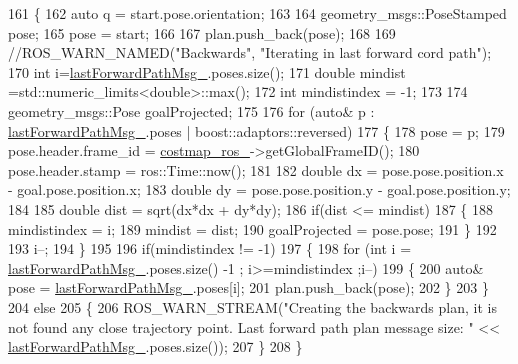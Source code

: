 \begin{DoxyCode}
161 \{
162     \textcolor{keyword}{auto} q = start.pose.orientation;
163 
164     geometry\_msgs::PoseStamped pose;
165     pose = start;
166 
167     plan.push\_back(pose);
168 
169     \textcolor{comment}{//ROS\_WARN\_NAMED("Backwards", "Iterating in last forward cord path");}
170     \textcolor{keywordtype}{int} i=\hyperlink{classbackward__global__planner_1_1BackwardGlobalPlanner_a2fe940d13931d4e6e27e3c3d5e5a7db8}{lastForwardPathMsg\_}.poses.size();
171     \textcolor{keywordtype}{double} mindist =std::numeric\_limits<double>::max();
172     \textcolor{keywordtype}{int} mindistindex = -1;
173 
174     geometry\_msgs::Pose goalProjected;
175 
176     \textcolor{keywordflow}{for} (\textcolor{keyword}{auto}& p : \hyperlink{classbackward__global__planner_1_1BackwardGlobalPlanner_a2fe940d13931d4e6e27e3c3d5e5a7db8}{lastForwardPathMsg\_}.poses | boost::adaptors::reversed) 
177     \{
178         pose = p;
179         pose.header.frame\_id = \hyperlink{classbackward__global__planner_1_1BackwardGlobalPlanner_afacbfb009c468d3c47959ca413eb6606}{costmap\_ros\_}->getGlobalFrameID();
180         pose.header.stamp = ros::Time::now();
181 
182         \textcolor{keywordtype}{double} dx = pose.pose.position.x - goal.pose.position.x;
183         \textcolor{keywordtype}{double} dy = pose.pose.position.y - goal.pose.position.y;
184         
185         \textcolor{keywordtype}{double} dist = sqrt(dx*dx + dy*dy);
186         \textcolor{keywordflow}{if}(dist <= mindist)
187         \{
188             mindistindex = i;
189             mindist = dist;
190             goalProjected = pose.pose;
191         \}
192 
193         i--;
194     \}
195 
196     \textcolor{keywordflow}{if}(mindistindex != -1)
197     \{
198         \textcolor{keywordflow}{for} (\textcolor{keywordtype}{int} i = \hyperlink{classbackward__global__planner_1_1BackwardGlobalPlanner_a2fe940d13931d4e6e27e3c3d5e5a7db8}{lastForwardPathMsg\_}.poses.size() -1 ; i>=mindistindex ;i--)
199         \{
200             \textcolor{keyword}{auto}& pose = \hyperlink{classbackward__global__planner_1_1BackwardGlobalPlanner_a2fe940d13931d4e6e27e3c3d5e5a7db8}{lastForwardPathMsg\_}.poses[i];
201             plan.push\_back(pose);
202         \}
203     \}
204     \textcolor{keywordflow}{else}
205     \{
206         ROS\_WARN\_STREAM(\textcolor{stringliteral}{"Creating the backwards plan, it is not found any close trajectory point. Last
       forward path plan message size: "} << \hyperlink{classbackward__global__planner_1_1BackwardGlobalPlanner_a2fe940d13931d4e6e27e3c3d5e5a7db8}{lastForwardPathMsg\_}.poses.size());
207     \}
208 \}
\end{DoxyCode}


